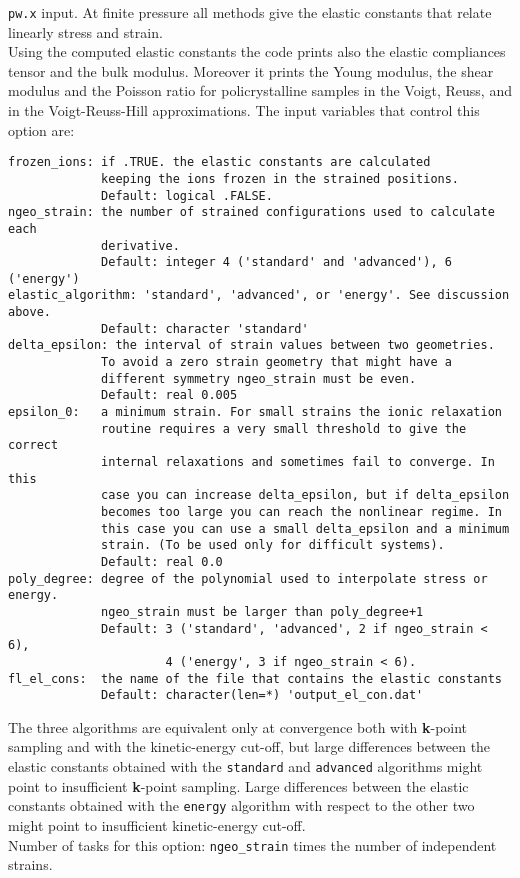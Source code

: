 \documentclass[12pt,a4paper]{article}
\begin{document}
\texttt{pw.x} input.
At finite pressure all methods give the elastic constants that
relate linearly stress and strain. \\
Using the computed elastic constants the code prints also the elastic 
compliances tensor and the bulk modulus. Moreover it prints the
Young modulus, the shear modulus and the Poisson ratio for policrystalline
samples in the Voigt, Reuss, and in the Voigt-Reuss-Hill approximations.
The input variables that control this option are:
\begin{verbatim}
frozen_ions: if .TRUE. the elastic constants are calculated 
             keeping the ions frozen in the strained positions. 
             Default: logical .FALSE.
ngeo_strain: the number of strained configurations used to calculate each
             derivative. 
             Default: integer 4 ('standard' and 'advanced'), 6 ('energy')
elastic_algorithm: 'standard', 'advanced', or 'energy'. See discussion above.
             Default: character 'standard' 
delta_epsilon: the interval of strain values between two geometries.
             To avoid a zero strain geometry that might have a
             different symmetry ngeo_strain must be even.
             Default: real 0.005
epsilon_0:   a minimum strain. For small strains the ionic relaxation 
             routine requires a very small threshold to give the correct 
             internal relaxations and sometimes fail to converge. In this 
             case you can increase delta_epsilon, but if delta_epsilon 
             becomes too large you can reach the nonlinear regime. In 
             this case you can use a small delta_epsilon and a minimum 
             strain. (To be used only for difficult systems).
             Default: real 0.0
poly_degree: degree of the polynomial used to interpolate stress or energy.
             ngeo_strain must be larger than poly_degree+1
             Default: 3 ('standard', 'advanced', 2 if ngeo_strain < 6), 
                      4 ('energy', 3 if ngeo_strain < 6).
fl_el_cons:  the name of the file that contains the elastic constants
             Default: character(len=*) 'output_el_con.dat'
\end{verbatim}
The three algorithms are equivalent only at convergence both with
{\bf k}-point sampling and with the kinetic-energy cut-off, but 
large differences between the elastic constants obtained with the 
\texttt{standard} and \texttt{advanced} algorithms might point to 
insufficient {\bf k}-point sampling. Large differences between the 
elastic constants obtained with the \texttt{energy} algorithm with respect 
to the other two might point to insufficient kinetic-energy cut-off. \\
Number of tasks for this option: \texttt{ngeo\_strain} times the number of
independent strains. \\
\end{document}
